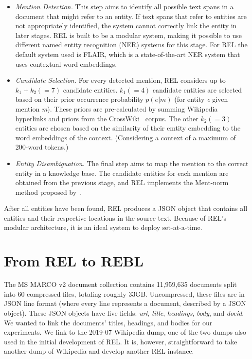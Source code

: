 \begin{itemize}
	\item \emph{Mention Detection.} 
	This step aims to identify all possible text spans in a document that might refer to an entity. If text spans that refer to entities are not appropriately identified, the system cannot correctly link the entity in later stages. REL is built to be a modular system, making it possible to use different named entity recognition (NER) systems for this stage. For REL the default system used is FLAIR, which is a state-of-the-art NER system that uses contextual word embeddings. 
	\item \emph{Candidate Selection.}
	For every detected mention, REL considers up to $k_1 + k_2 (=7)$ candidate entities. $k_1 (=4)$ candidate entities are selected based on their prior occurrence probability $p(e|m)$ (for entity \textit{e} given mention \textit{m}). These priors are pre-calculated by summing Wikipedia hyperlinks and priors from the CrossWiki~\citep{crosswiki} corpus. The other $k_2 (=3)$ entities are chosen based on the similarity of their emtity embedding to the word embeddings of the context. (Considering a context of a maximum of 200-word tokens.)
	\item \emph{Entity Disambiguation.}
	The final step aims to map the mention to the correct entity in a knowledge base. The candidate entities for each mention are obtained from the previous stage, and REL implements the Ment-norm method proposed by~\citet{ED-paper}.  
\end{itemize} 

After all entities have been found, REL produces a JSON object that contains all entities and their respective locations in the source text. Because of REL's modular architecture, it is an ideal system to deploy set-at-a-time. 

\section{From REL to REBL}
The MS MARCO v2 document collection contains 11,959,635 documents split into 60 compressed files, totaling roughly 33GB. Uncompressed, these files are in JSON line format (where every line represents a document, described by a JSON object). These JSON objects have five fields: \textit{url}, \textit{title}, \textit{headings}, \textit{body}, and \textit{docid}. We wanted to link the documents' titles, headings, and bodies for our experiments. We link to the 2019-07 Wikipedia dump, one of the two dumps also used in the initial development of REL. It is, however, straightforward to take another dump of Wikipedia and develop another REL instance. 


